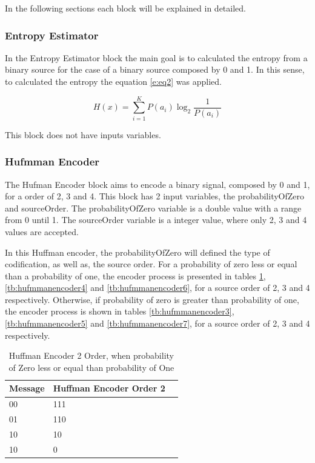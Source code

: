 \begin{refsection}
In the following sections each block will be explained in detailed.


\subsubsection{Entropy Estimator}
In the Entropy Estimator block the main goal is to calculated the entropy from a binary source for the case of a binary source composed by 0 and 1. In this sense, to calculated the entropy the equation \ref{e:eq2} was applied.


\begin{equation}
H(x)=\sum_{i=1}^K P(a_{i})  \log_2\frac{1}{P(a_{i})}
 \label{e:eq2}
\end{equation}

This block does not have inputs variables.

\subsubsection{Hufmman Encoder}
The Hufman Encoder block aims to encode a binary signal, composed by 0 and 1, for a order of 2, 3 and 4. This block has 2 input variables, the probabilityOfZero and sourceOrder.
The probabilityOfZero variable is a double value with a range from 0 until 1. The sourceOrder variable is a integer value, where only 2, 3 and 4 values are accepted.

In this Huffman encoder, the probabilityOfZero will defined the type of codification, as well as, the source order. For a probability of zero less or equal than a probability of one, the encoder process is presented in tables \ref{tb:hufmmanencoder2}, \ref{tb:hufmmanencoder4} and \ref{tb:hufmmanencoder6}, for a source order of 2, 3 and 4 respectively.
Otherwise, if probability of zero is greater than probability of one, the encoder process is shown in tables \ref{tb:hufmmanencoder3}, \ref{tb:hufmmanencoder5} and \ref{tb:hufmmanencoder7}, for a source order of 2, 3 and 4 respectively.

\begin{table}[H]
\centering
\caption{Huffman Encoder 2 Order, when probability of Zero less or equal than probability of One}
\label{tb:hufmmanencoder2}
\begin{tabular}{|l|l|l|}
\hline
\textbf{Message}                      & \textbf{Huffman Encoder Order 2}                                       \\ \hline
00                 & 111                                                          \\ \hline
01                 & 110                                                          \\ \hline
10                 & 10                                                         \\ \hline
10                 & 0                                                         \\ \hline


\end{tabular}
\end{table}
\end{refsection}
